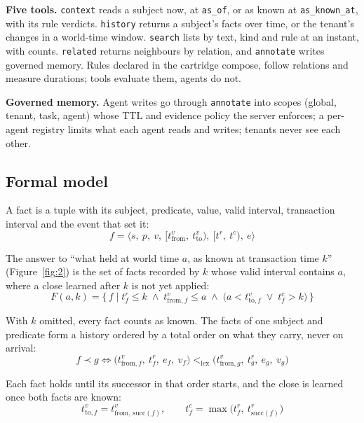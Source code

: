 \documentclass{article}
\newcommand{\code}[1]{\texttt{#1}}
\begin{document}
\textbf{Five tools.} \code{context} reads a subject now, at \code{as\_of}, or as known at \code{as\_known\_at}, with its rule verdicts. \code{history} returns a subject's facts over time, or the tenant's changes in a world-time window. \code{search} lists by text, kind and rule at an instant, with counts. \code{related} returns neighbours by relation, and \code{annotate} writes governed memory. Rules declared in the cartridge compose, follow relations and measure durations; tools evaluate them, agents do not.

\textbf{Governed memory.} Agent writes go through \code{annotate} into scopes (global, tenant, task, agent) whose TTL and evidence policy the server enforces; a per-agent registry limits what each agent reads and writes; tenants never see each other.

\subsection{Formal model}
\label{sec:formal}

A fact is a tuple with its subject, predicate, value, valid interval, transaction interval and the event that set it:
\begin{equation*}
f = \langle s,\ p,\ v,\ [t^{v}_{\mathrm{from}},\ t^{v}_{\mathrm{to}}),\ [t^{r},\ t^{c}),\ e \rangle
\end{equation*}

The answer to ``what held at world time $a$, as known at transaction time $k$'' (Figure~\ref{fig:2}) is the set of facts recorded by $k$ whose valid interval contains $a$, where a close learned after $k$ is not yet applied:
\begin{equation*}
F(a, k) = \{\, f \mid t^{r}_f \le k \;\wedge\; t^{v}_{\mathrm{from},f} \le a \;\wedge\; \big(a < t^{v}_{\mathrm{to},f} \;\vee\; t^{c}_f > k\big) \,\}
\end{equation*}

With $k$ omitted, every fact counts as known. The facts of one subject and predicate form a history ordered by a total order on what they carry, never on arrival:
\begin{equation*}
f \prec g \iff \big(t^{v}_{\mathrm{from},f},\ t^{r}_f,\ e_f,\ v_f\big) <_{\mathrm{lex}} \big(t^{v}_{\mathrm{from},g},\ t^{r}_g,\ e_g,\ v_g\big)
\end{equation*}

Each fact holds until its successor in that order starts, and the close is learned once both facts are known:
\begin{equation*}
t^{v}_{\mathrm{to},f} = t^{v}_{\mathrm{from},\,\mathrm{succ}(f)}, \qquad t^{c}_f = \max\big(t^{r}_f,\ t^{r}_{\mathrm{succ}(f)}\big)
\end{equation*}
\end{document}
